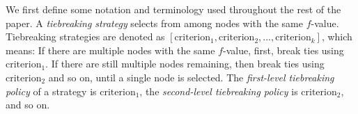 
We first define some notation and terminology used throughout the rest of the paper.
A \emph{tiebreaking strategy} selects from among nodes with the same $f$-value.
Tiebreaking strategies are denoted as $[\text{criterion}_1, \text{criterion}_2, ..., \text{criterion}_k]$,
which means: If there are multiple nodes with the same $f$-value, first, break ties using $\text{criterion}_1$. 
If there are still multiple nodes remaining, then break ties using $\text{criterion}_2$ and so on, until a single node is selected.
The \emph{first-level tiebreaking policy} of a strategy is
$\text{criterion}_1$, the \emph{second-level tiebreaking policy} is
$\text{criterion}_2$, and so on.
